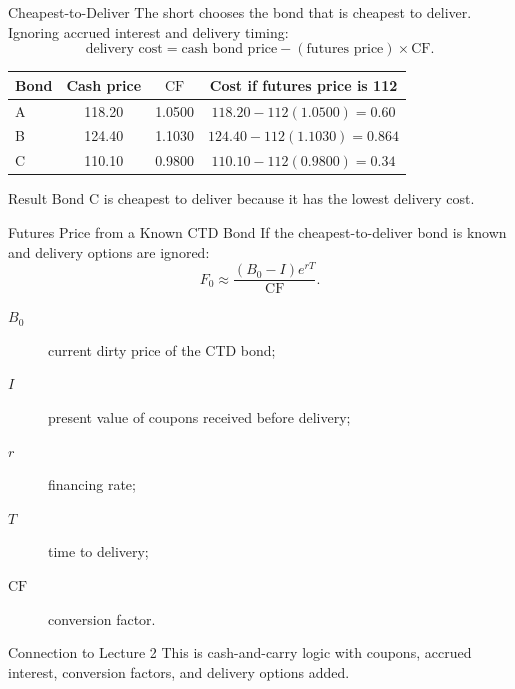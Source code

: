 \documentclass[aspectratio=169,11pt]{beamer}
\newcommand{\CF}{\mathrm{CF}}
\begin{document}
\begin{frame}{Cheapest-to-Deliver}
    \small
    The short chooses the bond that is cheapest to deliver.
    Ignoring accrued interest and delivery timing:
    \[
        \text{delivery cost}
        =
        \text{cash bond price}-(\text{futures price})\times \CF.
    \]

    \begin{center}
        \begin{tabular}{@{}lccc@{}}
            \toprule
            Bond & Cash price & \(\CF\) & Cost if futures price is 112 \\
            \midrule
            A & 118.20 & 1.0500 & \(118.20-112(1.0500)=0.60\) \\
            B & 124.40 & 1.1030 & \(124.40-112(1.1030)=0.864\) \\
            C & 110.10 & 0.9800 & \(110.10-112(0.9800)=0.34\) \\
            \bottomrule
        \end{tabular}
    \end{center}

    \begin{exampleblock}{Result}
        Bond C is cheapest to deliver because it has the lowest delivery cost.
    \end{exampleblock}
\end{frame}

\begin{frame}{Futures Price from a Known CTD Bond}
    If the cheapest-to-deliver bond is known and delivery options are ignored:
    \[
        F_0\approx \frac{(B_0-I)e^{rT}}{\CF}.
    \]

    \begin{description}
        \item[\(B_0\)] current dirty price of the CTD bond;
        \item[\(I\)] present value of coupons received before delivery;
        \item[\(r\)] financing rate;
        \item[\(T\)] time to delivery;
        \item[\(\CF\)] conversion factor.
    \end{description}

    \begin{block}{Connection to Lecture 2}
        This is cash-and-carry logic with coupons, accrued interest, conversion factors, and delivery options added.
    \end{block}
\end{frame}
\end{document}
